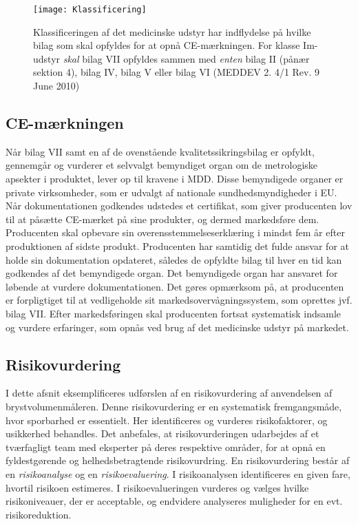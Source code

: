 \begin{figure}[htb]
\centering
\texttt{[image: Klassificering]}
\caption{Klassificeringen af det medicinske udstyr har indflydelse på hvilke bilag som skal opfyldes for at opnå CE-mærkningen. For klasse Im-udstyr \textit{skal} bilag VII opfyldes sammen med \textit{enten} bilag II (pånær sektion 4), bilag IV, bilag V eller bilag VI (MEDDEV 2. 4/1 Rev. 9 June 2010)}
\label{fig:Klas}
\end{figure}

\subsection{CE-mærkningen}
   
Når bilag VII samt en af de ovenstående kvalitetssikringsbilag er opfyldt, gennemgår og vurderer et selvvalgt bemyndiget organ om de metrologiske apsekter i produktet, lever op til kravene i MDD. Disse bemyndigede organer er private virksomheder, som er udvalgt af nationale sundhedsmyndigheder i EU. Når dokumentationen godkendes udstedes et certifikat, som giver producenten lov til at påsætte CE-mærket på sine produkter, og dermed markedsføre dem.    
 Producenten skal opbevare sin overensstemmelseserklæring i mindst fem år efter produktionen af sidste produkt. Producenten har samtidig det fulde ansvar for at holde sin dokumentation opdateret, således de opfyldte bilag til hver en tid kan godkendes af det bemyndigede organ. Det bemyndigede organ har ansvaret for løbende at vurdere dokumentationen.
Det gøres opmærksom på, at producenten er forpligtiget til at vedligeholde sit markedsovervågningssystem, som oprettes jvf. bilag VII. Efter markedsføringen skal producenten fortsat systematisk indsamle og vurdere erfaringer, som opnås ved brug af det medicinske udstyr på markedet. 

\subsection{Risikovurdering}
I dette afsnit eksemplificeres udførslen af en risikovurdering af anvendelsen af brystvolumenmåleren. Denne risikovurdering er en systematisk fremgangsmåde, hvor sporbarhed er essentielt. Her identificeres og vurderes risikofaktorer, og usikkerhed behandles. 
Det anbefales, at risikovurderingen udarbejdes af et tværfagligt team med eksperter på deres respektive områder, for at opnå en fyldestgørende og helhedsbetragtende risikovurdring.   
En risikovurdering består af en \textit{risikoanalyse} og en \textit{risikoevaluering}. I risikoanalysen identificeres en given fare, hvortil risikoen estimeres. I risikoevalueringen vurderes og vælges hvilke risikoniveauer, der er acceptable, og endvidere analyseres muligheder for en evt. risikoreduktion.

